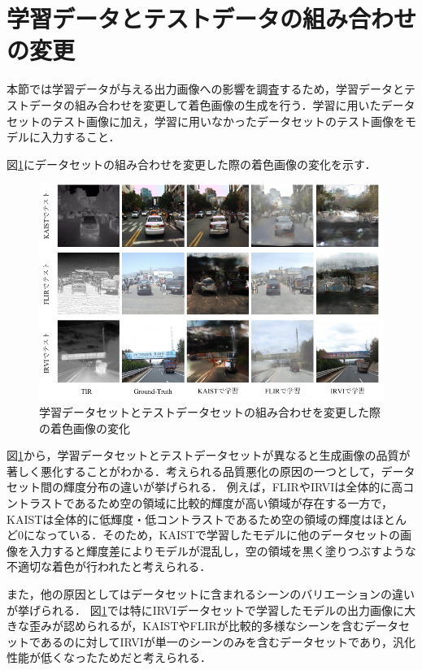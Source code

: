 \section{学習データとテストデータの組み合わせの変更}
本節では学習データが与える出力画像への影響を調査するため，学習データとテストデータの組み合わせを変更して着色画像の生成を行う．学習に用いたデータセットのテスト画像に加え，学習に用いなかったデータセットのテスト画像をモデルに入力すること．\par
図\ref{fig:dataset_swap}にデータセットの組み合わせを変更した際の着色画像の変化を示す．

\begin{figure}[tb]
    \centering
    \includegraphics[clip, width=1\columnwidth]{images/dataset_swap.pdf}
    \caption{学習データセットとテストデータセットの組み合わせを変更した際の着色画像の変化}
    \label{fig:dataset_swap}
\end{figure}

図\ref{fig:dataset_swap}から，学習データセットとテストデータセットが異なると生成画像の品質が著しく悪化することがわかる．考えられる品質悪化の原因の一つとして，データセット間の輝度分布の違いが挙げられる．
例えば，FLIRやIRVIは全体的に高コントラストであるため空の領域に比較的輝度が高い領域が存在する一方で，KAISTは全体的に低輝度・低コントラストであるため空の領域の輝度はほとんど0になっている．そのため，KAISTで学習したモデルに他のデータセットの画像を入力すると輝度差によりモデルが混乱し，空の領域を黒く塗りつぶすような不適切な着色が行われたと考えられる．\par
また，他の原因としてはデータセットに含まれるシーンのバリエーションの違いが挙げられる．
図\ref{fig:dataset_swap}では特にIRVIデータセットで学習したモデルの出力画像に大きな歪みが認められるが，KAISTやFLIRが比較的多様なシーンを含むデータセットであるのに対してIRVIが単一のシーンのみを含むデータセットであり，汎化性能が低くなったためだと考えられる．